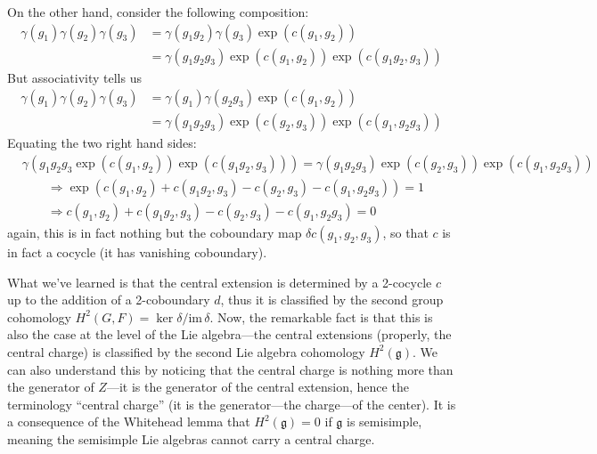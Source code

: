 \documentclass{report}
\begin{document}
On the other hand, consider the following composition: 
\begin{align*}
	\gamma(g_1) \gamma(g_2) \gamma(g_3) &= \gamma(g_1 g_2) \gamma(g_3) \exp(c(g_1, g_2))\\
		&= \gamma(g_1 g_2 g_3) \exp(c(g_1, g_2)) \exp(c(g_1 g_2, g_3))
\end{align*}
But associativity tells us
\begin{align*}
	\gamma(g_1) \gamma(g_2) \gamma(g_3) &= \gamma(g_1) \gamma(g_2 g_3) \exp(c(g_1, g_2))\\
		&= \gamma(g_1 g_2 g_3) \exp(c(g_2, g_3)) \exp(c(g_1, g_2 g_3))
\end{align*}
Equating the two right hand sides:
\begin{align*}
	&\gamma(g_1 g_2 g_3\exp(c(g_1, g_2)) \exp(c(g_1 g_2, g_3)))
		= \gamma(g_1 g_2 g_3) \exp(c(g_2, g_3)) \exp(c(g_1, g_2 g_3))\\
	&\qquad \Longrightarrow \exp(c(g_1, g_2) + c(g_1 g_2, g_3) - c(g_2 , g_3) - c(g_1, g_2 g_3)) = 1\\ 
	&\qquad \Longrightarrow  c(g_1, g_2) + c(g_1 g_2, g_3) - c(g_2 , g_3) - c(g_1, g_2 g_3) = 0
\end{align*}
again, this is in fact nothing but the coboundary map $ \delta c(g_1, g_2, g_3) $, 
so that $ c $ is in fact a cocycle (it has vanishing coboundary). 

 What we've learned is that the central extension is
determined by a 2-cocycle $ c $ up to the addition of a 2-coboundary $ d $, thus
it is classified by the second group cohomology $ H^2(G, F) = \ker \delta /
\text{im}\, \delta$.
Now, the remarkable fact is that this is also the case at the level of the Lie 
algebra---the central extensions (properly, the central charge) is classified 
by the second Lie algebra cohomology $ H^2(\mathfrak{g}) $. We can also
understand this by noticing that the central charge is nothing more than the
generator of $ Z $---it is the generator of the central extension, hence the
terminology ``central charge'' (it is the generator---the charge---of the
center). It is a consequence of the Whitehead lemma that $ H^2(\mathfrak{g}) = 0$
if $ \mathfrak{g} $ is semisimple, meaning the semisimple Lie algebras cannot 
carry a central charge.
\end{document}
